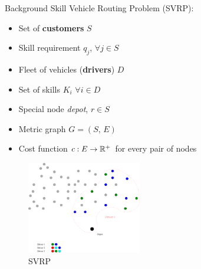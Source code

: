 \begin{frame}[t]{Background}
    Skill Vehicle Routing Problem (SVRP):
    \begin{minipage}[t]{0.48\textwidth}
        \begin{itemize}
            \item Set of \textbf{customers} $S$
            \item Skill requirement $q_j$,  $\forall j \in S$
            \item Fleet of vehicles (\textbf{drivers}) $D$
            \item Set of skills $K_i$ $\forall i \in D$
            \item Special node \emph{depot}, $r \in S$
            \item Metric graph $G = (S, \, E)$            
            \item Cost function $c:E \rightarrow \mathbb{R}^+$ for every pair of nodes
        \end{itemize}
    \end{minipage}
    \begin{minipage}[t]{0.48\textwidth}
        \begin{figure}
            \centering
            \includegraphics[width=5cm]{VRPSS02.pdf}
            \caption{SVRP}
            \label{fig:VRPSS02}
        \end{figure}            
    \end{minipage}    
\end{frame}

